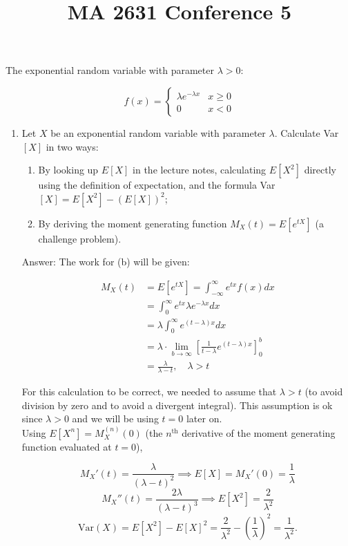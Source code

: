 \documentclass{article}
\title{MA 2631 Conference 5}
\begin{document}
\maketitle

The exponential random variable with parameter $\lambda >0$:

$$
f(x) = \begin{cases}
\lambda e^{-\lambda x} & x \geq 0 \\
0 & x < 0
\end{cases}
$$

\begin{enumerate}

\item

Let $X$ be an exponential random variable with parameter $\lambda$. Calculate Var$[X]$ in two ways:

\begin{enumerate}
\item By looking up $E[X]$ in the lecture notes, calculating $E[X^2]$ directly using the definition of expectation, and the formula Var$[X] = E[X^2] - (E[X])^2$;

\item By deriving the moment generating function $M_X(t) = E[e^{tX}]$ (a challenge problem). 
\end{enumerate}

Answer: The work for (b) will be given:

\begin{align*}
M_X(t) &= E[e^{tX}] = \int_{-\infty}^\infty e^{tx}f(x) dx \\
&= \int_{0}^\infty e^{tx}\lambda e^{-\lambda x} dx \\
&= \lambda \int_0^\infty e^{(t-\lambda)x} dx \\
&= \lambda \cdot \lim_{b \rightarrow \infty} \left[\frac{1}{t-\lambda}e^{(t-\lambda)x} \right]_{0}^b \\
&= \frac{\lambda}{\lambda - t}, \quad \lambda > t
\end{align*}

For this calculation to be correct, we needed to assume that $\lambda > t$ (to avoid division by zero and to avoid a divergent integral). This assumption is ok since $\lambda >0$ and we will be using $t=0$ later on. \\

Using $E[X^n] = M_X^{(n)}(0)$ (the $n^{\text{th}}$ derivative of the moment generating function evaluated at $t =0$),

$$M_X'(t) = \frac{\lambda}{(\lambda - t)^2} \implies E[X] = M_X'(0) = \frac{1}{\lambda}$$
$$M_X''(t) = \frac{2\lambda}{(\lambda - t)^3} \implies E[X^2] = \frac{2}{\lambda^2}$$
$$\text{Var}(X) = E[X^2] - E[X]^2 = \frac{2}{\lambda^2} - \left(\frac{1}{\lambda}\right)^2 = \frac{1}{\lambda^2}. $$


\end{enumerate}
\end{document}

